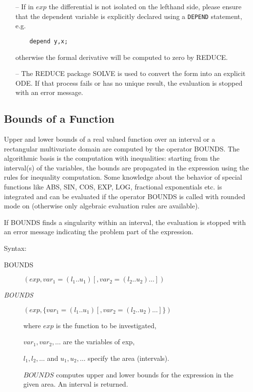 \begin{enumerate}

\item[--] If in $exp$ the differential is not isolated on the lefthand side,
please ensure that the dependent variable is explicitly declared
using a \verb+DEPEND+ statement, e.g.

\begin{verbatim}
    depend y,x;
\end{verbatim}

otherwise the formal derivative will be computed to zero by REDUCE.

\item[--] The REDUCE package SOLVE is used to convert the form into
an explicit ODE. If that process fails or has no unique result,
the evaluation is stopped with an error message.

\end{enumerate}

\subsection{Bounds of a Function}

Upper and lower bounds of a real valued function over an
interval or a rectangular multivariate domain are computed
by the operator BOUNDS. The algorithmic basis is the computation
with inequalities: starting from the interval(s) of the
variables, the bounds are propagated in the expression
using the rules for inequality computation. Some knowledge
about the behavior of special functions like ABS, SIN, COS, EXP, LOG,
fractional exponentials etc. is integrated and can be evaluated
if the operator BOUNDS is called with rounded mode on
(otherwise only algebraic evaluation rules are available).

If BOUNDS finds a singularity within an interval, the evaluation
is stopped with an error message indicating the problem part
of the expression.

Syntax:


\begin{description}
\item[BOUNDS]$(exp,var_1=(l_1 .. u_1) [,var_2=(l_2 .. u_2) \ldots])$

\item[{\it BOUNDS}]$(exp,\{var_1=(l_1 .. u_1) [,var_2=(l_2 .. u_2)\ldots]\})$

where $exp$ is the function to be investigated,

$var_1, var_2 , \ldots$ are the variables of exp,

$l_1, l_2 , \ldots$  and  $u_1, u_2 , \ldots$ specify the area (intervals).

$BOUNDS$ computes upper and lower bounds for the expression in the
given area. An interval is returned.

\end{description}

